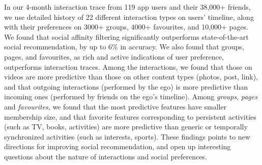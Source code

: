 In our 4-month interaction trace from 119 app users and their 38,000+ friends, 
we use detailed history of 22 different interaction types on users' timeline, 
along with their preferences on 3000+ groups, 4000+ favourites, and 10,000+ pages. 
We found that social affinity filtering significantly 
outperforms state-of-the-art social recommendation, by up to 6\% in accuracy.
We also found that groups, pages, and favourites, 
as rich and active indications of user preference, outperforms interaction traces. 
Among the interactions, we found that those on videos are more predictive than those on other content types (photos, post, link), and that outgoing interactions (performed by the ego) 
is more predictive than incoming ones (performed by friends on the ego's timeline).
Among {\em groups}, {\em pages} and {\em favourites}, we found that the most  
predictive features have smaller membership size, and that favorite features corresponding to 
persistent activities (such as TV, books, activities) are more predictive than generic or 
temporally synchronized activities (such as interests, sports). 
These findings points to new directions for improving social recommendation, 
and open up interesting questions about the nature of interactions and social preferences. 



